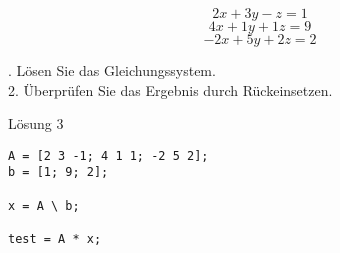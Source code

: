                 \[2x + 3y - z = 1\]
                \[4x + 1y + 1z = 9\]
                \[-2x + 5y + 2z = 2\]

            . Lösen Sie das Gleichungssystem.\\
            2. Überprüfen Sie das Ergebnis durch Rückeinsetzen.

            \begin{Codelösung}{Lösung 3}
                \begin{lstlisting}
A = [2 3 -1; 4 1 1; -2 5 2];
b = [1; 9; 2];

x = A \ b;

test = A * x;
                \end{lstlisting}
            \end{Codelösung}